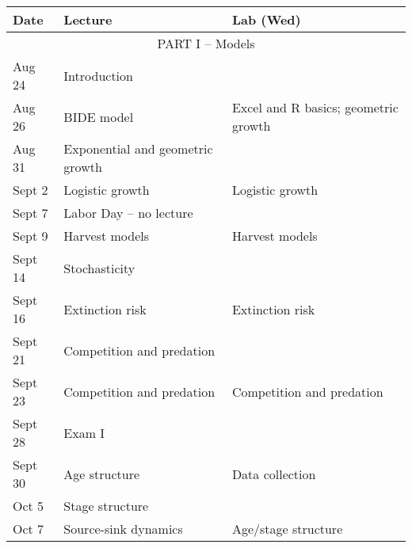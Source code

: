\documentclass[12pt]{article}
\begin{document}
\begin{center}
\begin{tabular}[c]{lll}
\hline \hline
{\bf Date} & {\bf Lecture}                      & {\bf Lab (Wed)}                      \\
\hline
           \multicolumn{3}{c}{PART I -- Models}                                        \\
\hline
\hline
Aug 24     & Introduction                       &                                      \\
Aug 26     & BIDE model                         & Excel and R basics; geometric growth \\
\hline
Aug 31     & Exponential and geometric growth   &                                      \\
Sept 2     & Logistic growth                    & Logistic growth                      \\
\hline
Sept 7     & Labor Day -- no lecture            &                                      \\
Sept 9     & Harvest models                     & Harvest models                       \\
\hline
Sept 14    & Stochasticity                      &                                      \\
Sept 16    & Extinction risk                    & Extinction risk                      \\
\hline
Sept 21    & Competition and predation          &                                      \\
Sept 23    & Competition and predation          & Competition and predation            \\
\hline
Sept 28    & Exam I                             &                                      \\
Sept 30    & Age structure                      & Data collection                      \\
\hline
Oct 5      & Stage structure                    &                                      \\
Oct 7      & Source-sink dynamics               & Age/stage structure                  \\

\end{tabular}
\end{center}
\end{document}
